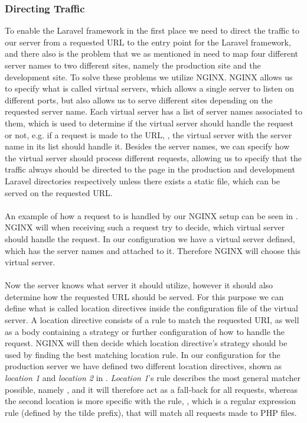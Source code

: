 \subsubsection{Directing Traffic}
\label{ssub:directing_traffic}
To enable the Laravel framework in the first place we need to direct the traffic to our server from a requested URL to the entry point for the Laravel framework, and there also is the problem that we as mentioned in  need to map four different server names to two different sites, namely the production site and the development site. To solve these problems we utilize NGINX. NGINX allows us to specify what is called virtual servers, which allows a single server to listen on different ports, but also allows us to serve different sites depending on the requested server name. Each virtual server has a list of server names associated to them, which is used to determine if the virtual server should handle the request or not, e.g. if a request is made to the URL, , the virtual server with the server name  in its list should handle it. 
Besides the server names, we can specify how the virtual server should process different requests, allowing us to specify that the traffic always should be directed to the  page in the production and development Laravel directories respectively unless there exists a static file, which can be served on the requested URL. 
\\\\
An example of how a request to  is handled by our NGINX setup can be seen in . NGINX will when receiving such a request try to decide, which virtual server should handle the request. In our configuration we have a virtual server defined, which has the server names  and  attached to it. Therefore NGINX will choose this virtual server. 
\\\\ %
Now the server knows what server it should utilize, however it should also determine how the requested URL should be served. For this purpose we can define what is called location directives inside the configuration file of the virtual server. A location directive consists of a rule to match the requested URI, as well as a body containing a strategy or further configuration of how to handle the request. NGINX will then decide which location directive's strategy should be used by finding the best matching location rule. In our configuration for the production server we have defined two different location directives, shown as \emph{location 1} and \emph{location 2} in . \emph{Location 1}'s rule describes the most general matcher possible, namely , and it will therefore act as a fall-back for all requests, whereas the second location is more specific with the rule, , which is a regular expression rule (defined by the tilde prefix), that will match all requests made to PHP files. 
